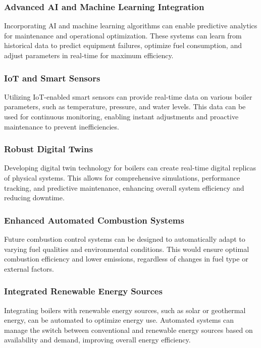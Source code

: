 \subsubsection{Advanced AI and Machine Learning Integration}

Incorporating AI and machine learning algorithms can enable predictive analytics for maintenance and operational optimization. These systems can learn from historical data to predict equipment failures, optimize fuel consumption, and adjust parameters in real-time for maximum efficiency.

\subsubsection{IoT and Smart Sensors}

Utilizing IoT-enabled smart sensors can provide real-time data on various boiler parameters, such as temperature, pressure, and water levels. This data can be used for continuous monitoring, enabling instant adjustments and proactive maintenance to prevent inefficiencies.

\subsubsection{Robust Digital Twins}

Developing digital twin technology for boilers can create real-time digital replicas of physical systems. This allows for comprehensive simulations, performance tracking, and predictive maintenance, enhancing overall system efficiency and reducing downtime.

\subsubsection{Enhanced Automated Combustion Systems}

Future combustion control systems can be designed to automatically adapt to varying fuel qualities and environmental conditions. This would ensure optimal combustion efficiency and lower emissions, regardless of changes in fuel type or external factors.

\subsubsection{Integrated Renewable Energy Sources}

Integrating boilers with renewable energy sources, such as solar or geothermal energy, can be automated to optimize energy use. Automated systems can manage the switch between conventional and renewable energy sources based on availability and demand, improving overall energy efficiency.

